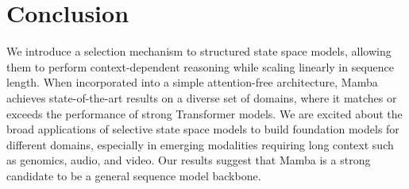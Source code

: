 \section{Conclusion}
\label{sec:conclusion}

We introduce a selection mechanism to structured state space models, allowing them to perform context-dependent reasoning while scaling linearly in sequence length.
When incorporated into a simple attention-free architecture, Mamba achieves state-of-the-art results on a diverse set of domains,
where it matches or exceeds the performance of strong Transformer models.
We are excited about the broad applications of selective state space models to build foundation models for different domains, especially in emerging modalities requiring long context such as genomics, audio, and video.
Our results suggest that Mamba is a strong candidate to be a general sequence model backbone.
